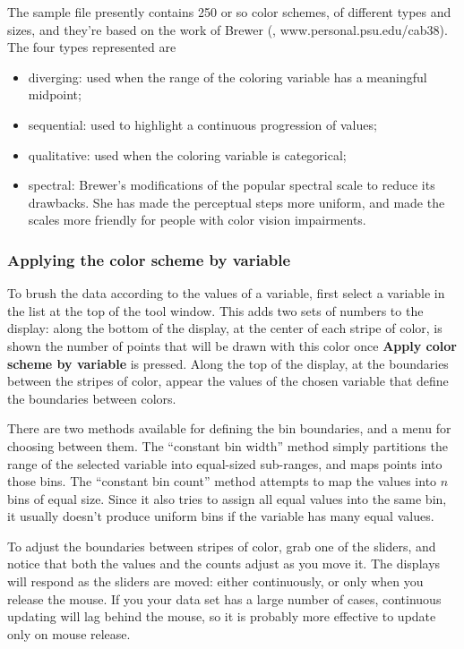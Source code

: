 \documentclass[11pt]{article}
\def\Widget#1{\textbf{#1}}
\begin{document}
The sample file presently contains 250 or so color schemes, of
different types and sizes, and they're based on the work of
Brewer (\cite{Brewer99}, www.personal.psu.edu/cab38).
The four types represented are

\begin{itemize}
\item diverging: used when the range of the coloring variable has
      a meaningful midpoint;
\item sequential: used to highlight a continuous progression of values;
\item qualitative: used when the coloring variable is categorical;
\item spectral: Brewer's modifications of the popular spectral scale
      to reduce its drawbacks.  She has made the perceptual steps
      more uniform, and made the scales more friendly for people with
      color vision impairments.
\end{itemize}

\subsubsection{Applying the color scheme by variable}

To brush the data according to the values of a variable, first select
a variable in the list at the top of the tool window.  This adds two
sets of numbers to the display: along the bottom of the display, at
the center of each stripe of color, is shown the number of points that
will be drawn with this color once \Widget{Apply color scheme by
variable} is pressed.  Along the top of the display, at the boundaries
between the stripes of color, appear the values of the chosen variable
that define the boundaries between colors.

There are two methods available for defining the bin boundaries, and
a menu for choosing between them.  The ``constant bin width'' method
simply partitions the range of the selected variable into equal-sized
sub-ranges, and maps points into those bins.  The ``constant bin
count'' method attempts to map the values into $n$ bins of equal
size.  Since it also tries to assign all equal values into the same
bin, it usually doesn't produce uniform bins if the variable has many
equal values.

To adjust the boundaries between stripes of color, grab one of the
sliders, and notice that both the values and the counts adjust as you
move it.  The displays will respond as the sliders are moved:  either
continuously, or only when you release the mouse.  If you your data set
has a large number of cases, continuous updating will lag behind the
mouse, so it is probably more effective to update only on mouse release.
\end{document}
